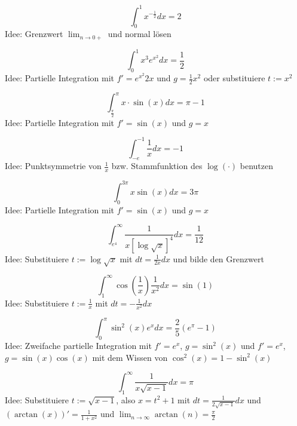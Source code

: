 \documentclass[parskip=full]{scrartcl}
\begin{document}
\begin{displaymath}
  \int_{0}^{1} x^{-\frac{1}{2}} dx = 2
\end{displaymath}
Idee: Grenzwert $\lim_{n \to 0+}$ und normal lösen

\begin{displaymath}
  \int_{0}^{1} x^3e^{x^2} dx = \frac{1}{2}
\end{displaymath}
Idee: Partielle Integration mit $f' = e^{x^2}2x$ und $g = \frac{1}{2}x^2$ oder substituiere $t := x^2$

\begin{displaymath}
  \int_{\frac{\pi}{2}}^{\pi} x \cdot \sin(x) dx = \pi - 1
\end{displaymath}
Idee: Partielle Integration mit $f' = \sin(x)$ und $g = x$

\begin{displaymath}
  \int_{-e}^{-1} \frac{1}{x} dx = -1
\end{displaymath}
Idee: Punktsymmetrie von $\frac{1}{x}$ bzw. Stammfunktion des $\log(\cdot)$ benutzen

\begin{displaymath}
  \int_{0}^{3\pi} x \sin(x) dx = 3\pi
\end{displaymath}
Idee: Partielle Integration mit $f' = \sin(x)$ und $g = x$

\begin{displaymath}
  \int_{e^4}^{\infty} \frac{1}{x[\log\sqrt{x}]^4}dx = \frac{1}{12}
\end{displaymath}
Idee: Substituiere $t := \log\sqrt{x}$ mit $dt = \frac{1}{2x}dx$ und bilde den Grenzwert

\begin{displaymath}
  \int_{1}^{\infty} \cos\left(\frac{1}{x}\right) \frac{1}{x^2} dx = \sin(1)
\end{displaymath}
Idee: Substituiere $t := \frac{1}{x}$ mit $dt = -\frac{1}{x^2}dx$

\begin{displaymath}
  \int_{0}^{\pi} \sin^2(x) e^x dx = \frac{2}{5} \left(e^{\pi} - 1\right)
\end{displaymath}
Idee: Zweifache partielle Integration mit $f' = e^x$, $g = \sin^2(x)$ und $f' = e^x$, $g = \sin(x)\cos(x)$ mit dem Wissen von $\cos^2(x) = 1 - \sin^2(x)$

\begin{displaymath}
  \int_{1}^{\infty} \frac{1}{x\sqrt{x - 1}} dx = \pi
\end{displaymath}
Idee: Substituiere $t := \sqrt{x - 1}$, also $x = t^2 + 1$ mit $dt = \frac{1}{2\sqrt{x - 1}}dx$ und $\left(\arctan(x)\right)' = \frac{1}{1 + x^2}$ und $\lim_{n \to \infty} \arctan(n) = \frac{\pi}{2}$
\end{document}
